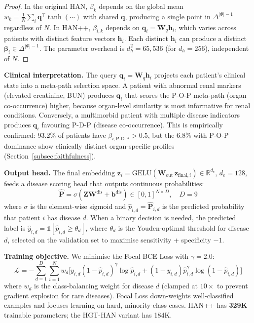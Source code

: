 \documentclass[conference]{IEEEtran}
\begin{document}
\begin{proof}
In the original HAN, $\beta_k$ depends on the global mean
$w_k = \frac{1}{N}\sum_i \mathbf{q}^{\top}\tanh(\cdots)$
with shared $\mathbf{q}$, producing a single point in
$\Delta^{|\Phi|-1}$ regardless of $N$.
In HAN++, $\beta_{i,k}$ depends on $\mathbf{q}_i = \mathbf{W}_q\mathbf{h}_i$,
which varies across patients with distinct feature vectors $\mathbf{h}_i$.
Each distinct $\mathbf{h}_i$ can produce a distinct
$\boldsymbol{\beta}_i \in \Delta^{|\Phi|-1}$.
The parameter overhead is $d_h^2 = 65{,}536$ (for $d_h = 256$),
independent of $N$.
\end{proof}

\textbf{Clinical interpretation.}
The query $\mathbf{q}_i = \mathbf{W}_q\mathbf{h}_i$ projects
each patient's clinical state into a meta-path selection space.
A patient with abnormal renal markers (elevated creatinine, BUN)
produces $\mathbf{q}_i$ that scores the P-O-P meta-path
(organ co-occurrence) higher, because organ-level similarity is most
informative for renal conditions.
Conversely, a multimorbid patient with multiple disease indicators
produces $\mathbf{q}_i$ favouring P-D-P (disease co-occurrence).
This is empirically confirmed: 93.2\% of patients have
$\beta_{i,\text{P-D-P}} > 0.5$, but the 6.8\% with P-O-P dominance
show clinically distinct organ-specific profiles
(Section~\ref{subsec:faithfulness}).

\textbf{Output head.}
The final embedding
$\mathbf{z}_i = \text{GELU}(\mathbf{W}_{\text{out}}\,
\mathbf{z}_{\text{final},i})
\in \mathbb{R}^{d_e}$, $d_e = 128$, feeds a disease scoring head
that outputs continuous probabilities:
\begin{equation}
  \hat{\mathbf{P}} = \sigma\!\left(\mathbf{Z}\mathbf{W}^{\text{dis}}
  + \mathbf{b}^{\text{dis}}\right)
    \in [0,1]^{N \times D}, \quad D = 9
  \label{eq:output}
\end{equation}
where $\sigma$ is the element-wise sigmoid and
$\hat{p}_{i,d} = \hat{\mathbf{P}}_{i,d}$ is the predicted probability
that patient $i$ has disease $d$.
When a binary decision is needed, the predicted label is
$\hat{y}_{i,d} = \mathbb{1}[\hat{p}_{i,d} \geq \theta_d]$,
where $\theta_d$ is the Youden-optimal threshold for disease $d$,
selected on the validation set to maximise sensitivity + specificity $- 1$.

\textbf{Training objective.}
We minimise the Focal BCE Loss \cite{lin_2017} with $\gamma = 2.0$:
\begin{equation}
  \mathcal{L} = -\sum_{d=1}^{D}\sum_{i=1}^{N}
    w_d \bigl[
      y_{i,d}(1-\hat{p}_{i,d})^{\gamma}\log\hat{p}_{i,d}
      + (1-y_{i,d})\hat{p}_{i,d}^{\gamma}\log(1-\hat{p}_{i,d})
    \bigr]
  \label{eq:focal}
\end{equation}
where $w_d$ is the class-balancing weight for disease $d$
(clamped at $10\times$ to prevent gradient explosion for rare diseases).
Focal Loss down-weights well-classified examples and focuses
learning on hard, minority-class cases.
HAN++ has \textbf{329K} trainable parameters; the HGT-HAN variant has 184K.
\end{document}
